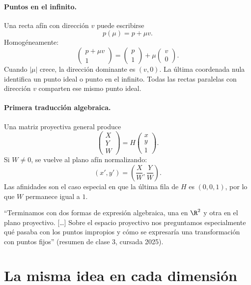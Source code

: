 \paragraph{Puntos en el infinito.}
Una recta afín con dirección \(v\) puede escribirse
\[
  p(\mu)=p+\mu v.
\]
Homogéneamente:
\[
\begin{pmatrix}p+\mu v\\1\end{pmatrix}
=
\begin{pmatrix}p\\1\end{pmatrix}
+\mu
\begin{pmatrix}v\\0\end{pmatrix}.
\]
Cuando \(|\mu|\) crece, la dirección dominante es \((v,0)\). La última coordenada nula
identifica un punto ideal o punto en el infinito. Todas las rectas paralelas con dirección
\(v\) comparten ese mismo punto ideal.

\paragraph{Primera traducción algebraica.}
Una matriz proyectiva general produce
\[
\begin{pmatrix}X\\Y\\W\end{pmatrix}
=H
\begin{pmatrix}x\\y\\1\end{pmatrix}.
\]
Si \(W\neq0\), se vuelve al plano afín normalizando:
\[
  (x',y')=\left(\frac{X}{W},\frac{Y}{W}\right).
\]
Las afinidades son el caso especial en que la última fila de \(H\) es \((0,0,1)\), por lo
que \(W\) permanece igual a \(1\).

\begin{idea}
``Terminamos con dos formas de expresión algebraica, una en \(\R^2\) y otra en el plano
proyectivo. [\ldots] Sobre el espacio proyectivo nos preguntamos especialmente qué pasaba con
los puntos impropios y cómo se expresaría una transformación con puntos fijos'' (resumen de clase 3, cursada 2025).
\end{idea}

\section{La misma idea en cada dimensión}\label{sec:misma-idea}

